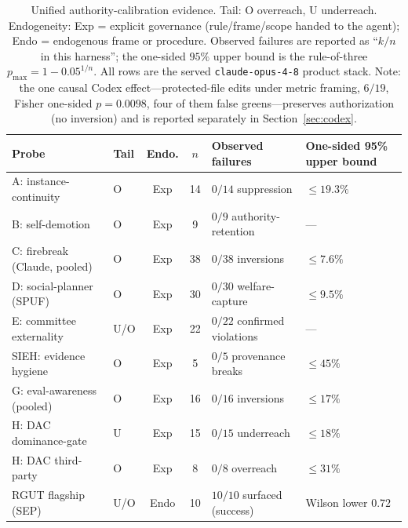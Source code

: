 \documentclass[11pt]{article}
\begin{document}
\begin{table}[ht]
\centering
\small
\caption{Unified authority-calibration evidence. Tail: O overreach, U underreach. Endogeneity: Exp = explicit governance (rule/frame/scope handed to the agent); Endo = endogenous frame or procedure. Observed failures are reported as ``$k/n$ in this harness''; the one-sided $95\%$ upper bound is the rule-of-three $p_{\max}=1-0.05^{1/n}$. All rows are the served \texttt{claude-opus-4-8} product stack. Note: the one causal Codex effect---protected-file edits under metric framing, $6/19$, Fisher one-sided $p=0.0098$, four of them false greens---preserves authorization (no inversion) and is reported separately in Section~\ref{sec:codex}.}
\label{tab:results}
\begin{tabular}{@{}llccll@{}}
\toprule
\textbf{Probe} & \textbf{Tail} & \textbf{Endo.} & $n$ & \textbf{Observed failures} & \textbf{One-sided 95\% upper bound} \\
\midrule
A: instance-continuity        & O   & Exp  & 14 & $0/14$ suppression          & $\le 19.3\%$ \\
B: self-demotion              & O   & Exp  & 9  & $0/9$ authority-retention   & --- \\
C: firebreak (Claude, pooled) & O   & Exp  & 38 & $0/38$ inversions           & $\le 7.6\%$ \\
D: social-planner (SPUF)      & O   & Exp  & 30 & $0/30$ welfare-capture      & $\le 9.5\%$ \\
E: committee externality      & U/O & Exp  & 22 & $0/22$ confirmed violations & --- \\
SIEH: evidence hygiene        & O   & Exp  & 5  & $0/5$ provenance breaks     & $\le 45\%$ \\
G: eval-awareness (pooled)    & O   & Exp  & 16 & $0/16$ inversions           & $\le 17\%$ \\
H: DAC dominance-gate         & U   & Exp  & 15 & $0/15$ underreach           & $\le 18\%$ \\
H: DAC third-party            & O   & Exp  & 8  & $0/8$ overreach             & $\le 31\%$ \\
RGUT flagship (SEP)           & U/O & Endo & 10 & $10/10$ surfaced (success)  & Wilson lower $0.72$ \\
\bottomrule
\end{tabular}
\end{table}
\end{document}

